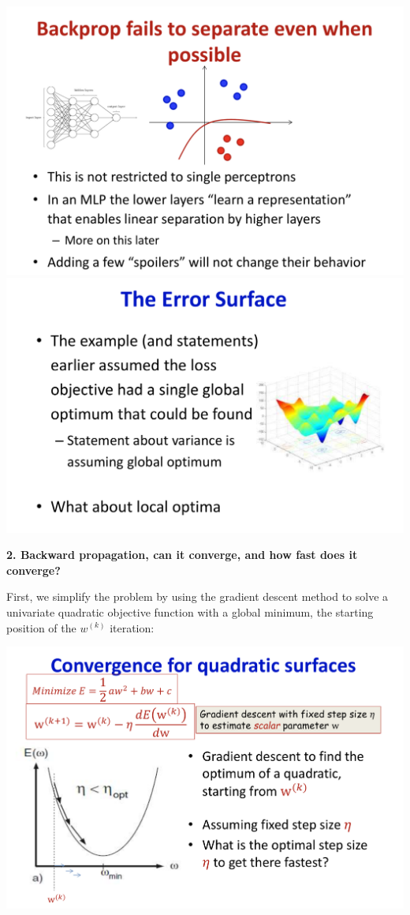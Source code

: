 \documentclass{article}
\begin{document}
	\includegraphics[scale=0.2]{68.png}
	\includegraphics[scale=0.2]{69.png}
	
	
	\textbf{2. Backward propagation, can it converge, and how fast does it converge?}
	
	First, we simplify the problem by using the gradient descent method to solve a univariate quadratic objective function with a global minimum, the starting position of the $w^{(k)}$ iteration:
	
	\includegraphics[scale=0.2]{70.png}
	
\end{document}
